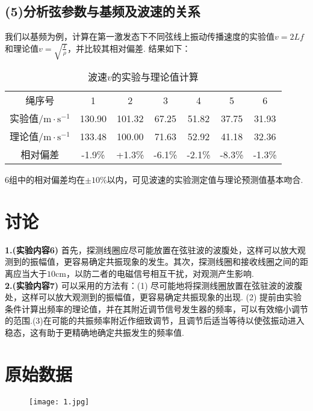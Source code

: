 \documentclass{ctexart}
\begin{document}
\subsection*{(5)分析弦参数与基频及波速的关系}
我们以基频为例，计算在第一激发态下不同弦线上振动传播速度的实验值$v=2Lf$和理论值$v=\sqrt{\frac{T}{\rho}}$，并比较其相对偏差. 结果如下：\\
\begin{table}[h]
    \caption{波速$v$的实验与理论值计算} \vspace{0.7em}
    \centering
    \begin{tabular}{ccccccc}
      \hline
      绳序号& 1& 2& 3& 4& 5& 6\\
      实验值/$\mathrm{m\cdot s^{-1}}$& 130.90& 101.32& 67.25& 51.82& 37.75& 31.93\\
      理论值/$\mathrm{m\cdot s^{-1}}$& 133.48 & 100.00 & 71.63 & 52.92 & 41.18 & 32.36\\
      相对偏差& -1.9\% & +1.3\% & -6.1\% & -2.1\% & -8.3\% & -1.3\% \\
      \hline
      \end{tabular}
  \end{table}   

6组中的相对偏差均在$\pm10\%$以内，可见波速的实验测定值与理论预测值基本吻合.

\section{讨论}

\noindent \textbf{1.(实验内容6)}  首先，探测线圈应尽可能放置在弦驻波的波腹处，这样可以放大观测到的振幅值，更容易确定共振现象的发生。其次，探测线圈和接收线圈之间的距离应当大于$10\mathrm{cm}$，以防二者的电磁信号相互干扰，对观测产生影响.\\
\noindent \textbf{2.(实验内容7)}  可以采用的方法有：(1) 尽可能地将探测线圈放置在弦驻波的波腹处，这样可以放大观测到的振幅值，更容易确定共振现象的出现. (2) 提前由实验条件计算出频率的理论值，并在其附近调节信号发生器的频率，可以有效缩小调节的范围.(3)在可能的共振频率附近作细致调节，且调节后适当等待以使弦振动进入稳态，这有助于更精确地确定共振发生的频率值.\\

\section{原始数据}

\begin{figure}  
  \centering                                          
  \texttt{[image: 1.jpg]}
  \end{figure}
\end{document}
